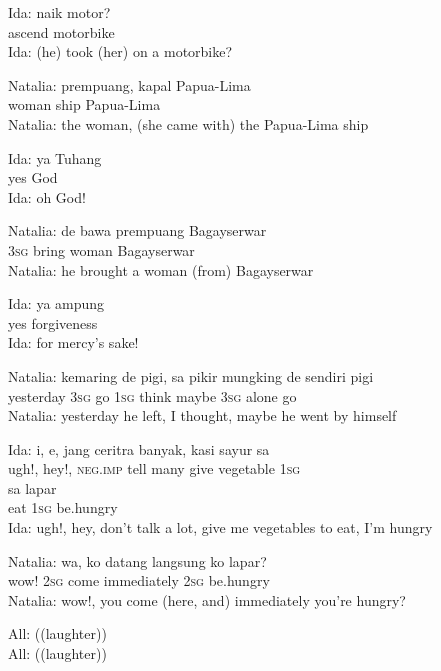 \ea
\gll   Ida:   naik   motor?\\
 {}    ascend   motorbike\\
\glt
Ida: (he) took (her) on a motorbike?
\z

\ea
\gll   Natalia:   prempuang,   kapal   Papua-Lima\\
 {}    woman   ship   Papua-Lima\\
\glt
Natalia: the woman, (she came with) the Papua-Lima ship
\z

\ea
\gll   Ida:   ya   Tuhang\\
  {}   yes   God\\
\glt
Ida: oh God!
\z

\ea
\gll   Natalia:   de   bawa   prempuang   Bagayserwar\\
 {}    \textsc{3sg}   bring   woman   Bagayserwar\\
\glt
Natalia: he brought a woman (from) Bagayserwar
\z

\ea
\gll   Ida:   ya   ampung\\
{}     yes   forgiveness\\
\glt
Ida: for mercy’s sake!
\z

\ea
\gll   Natalia:   kemaring   de   pigi,   sa   pikir   mungking   de   sendiri   pigi\\
 {}    yesterday   \textsc{3sg}   go   \textsc{1sg}   think   maybe   \textsc{3sg}   alone   go\\
\glt
Natalia: yesterday he left, I thought, maybe he went by himself
\z

\ea
\gll   Ida:    {i,}    {e,}   jang   ceritra   banyak,   kasi   sayur   sa\\
{}      {ugh!,}    {hey!,}   \textsc{neg.imp}   tell   many   give   vegetable   \textsc{1sg}\\
    {sa}    {lapar}\\
   {eat}    {\textsc{1sg}}    {be.hungry}\\
\glt
Ida: ugh!, hey, don’t talk a lot, give me vegetables to eat, I’m hungry
\z

\ea
\gll   Natalia:   wa,   ko   datang   langsung   ko   lapar?\\
 {}  wow!   \textsc{2sg}   come   immediately   \textsc{2sg}   be.hungry\\
\glt
Natalia: wow!, you come (here, and) immediately you’re hungry?
\z

\ea
\gll   All:   ((laughter))\\
All: ((laughter))\\
\z

